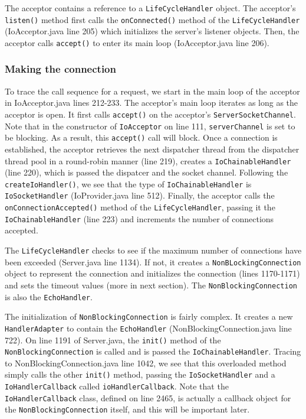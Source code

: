 \documentclass[letterpaper,12pt]{article}
\begin{document}
The acceptor contains a reference to a \texttt{LifeCycleHandler} object. The acceptor's \texttt{listen()} method first calls the \texttt{onConnected()} method of the \texttt{LifeCycleHandler} (IoAcceptor.java line 205) which initializes the server's listener objects. Then, the acceptor calls \texttt{accept()} to enter its main loop (IoAcceptor.java line 206).

\subsubsection{Making the connection}

To trace the call sequence for a request, we start in the main loop of the acceptor in IoAcceptor.java lines 212-233. The acceptor's main loop iterates as long as the acceptor is open. It first calls \texttt{accept()} on the acceptor's \texttt{ServerSocketChannel}. Note that in the constructor of \texttt{IoAcceptor} on line 111, \texttt{serverChannel} is set to be blocking. As a result, this \texttt{accept()} call will block. Once a connection is established, the acceptor retrieves the next dispatcher thread from the dispatcher thread pool in a round-robin manner (line 219), creates a \texttt{IoChainableHandler} (line 220), which is passed the dispatcer and the socket channel. Following the \texttt{createIoHandler()}, we see that the type of \texttt{IoChainableHandler} is \texttt{IoSocketHandler} (IoProvider.java line 512). Finally, the acceptor calls the \texttt{onConnectionAccepted()} method of the \texttt{LifeCycleHandler}, passing it the \texttt{IoChainableHandler} (line 223) and increments the number of connections accepted.

The \texttt{LifeCycleHandler} checks to see if the maximum number of connections have been exceeded (Server.java line 1134). If not, it creates a \texttt{NonBLockingConnection} object to represent the connection and initializes the connection (lines 1170-1171) and sets the timeout values (more in next section). The \texttt{NonBlockingConnection} is also the \texttt{EchoHandler}.

The initialization of \texttt{NonBlockingConnection} is fairly complex. It creates a new \texttt{HandlerAdapter} to contain the \texttt{EchoHandler} (NonBlockingConnection.java line 722). On line 1191 of Server.java, the \texttt{init()} method of the \texttt{NonBlockingConnection} is called and is passed the \texttt{IoChainableHandler}. Tracing to NonBlockingConnection.java line 1042, we see that this overloaded method simply calls the other \texttt{init()} method, passing the \texttt{IoSocketHandler} and a \texttt{IoHandlerCallback} called \texttt{ioHandlerCallback}. Note that the \texttt{IoHandlerCallback} class, defined on line 2465, is actually a callback object for the \texttt{NonBlockingConnection} itself, and this will be important later.
\end{document}
